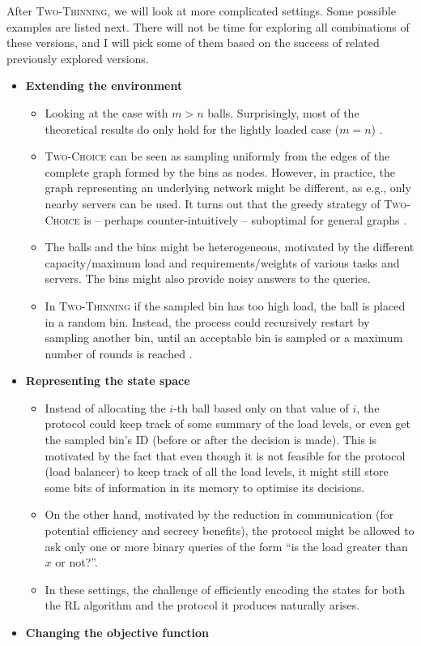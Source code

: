 After \textsc{Two-Thinning}, we will look at more complicated settings. Some possible examples are listed next. There will not be time for exploring all combinations of these versions, and I will pick some of them based on the success of related previously explored versions.
\begin{itemize}
    \item
    \textbf{Extending the environment}
    \begin{itemize}
        \item
        Looking at the case with $m>n$ balls. Surprisingly, most of the theoretical results do only hold for the lightly loaded case ($m=n$) \cite{berenbrink2006balanced}.
        \item
        \textsc{Two-Choice} can be seen as sampling uniformly from the edges of the complete graph formed by the bins as nodes. However, in practice, the graph representing an underlying network might be different, as e.g., only nearby servers can be used. It turns out that the greedy strategy of \textsc{Two-Choice} is -- perhaps counter-intuitively -- suboptimal for general graphs \cite{bansal2021well}.
        \item
        The balls and the bins might be heterogeneous, motivated by the different capacity/maximum load and requirements/weights of various tasks and servers. The bins might also provide noisy answers to the queries.
        \item
        In \textsc{Two-Thinning} if the sampled bin has too high load, the ball is placed in a random bin. Instead, the process could recursively restart by sampling another bin, until an acceptable bin is sampled or a maximum number of rounds is reached \cite{czumaj1997randomized}.
    \end{itemize}
    
    \item
    \textbf{Representing the state space}
    
    \begin{itemize}
        \item
        Instead of allocating the $i$-th ball based only on that value of $i$, the protocol could keep track of some summary of the load levels, or even get the sampled bin's ID (before or after the decision is made). This is motivated by the fact that even though it is not feasible for the protocol (load balancer) to keep track of all the load levels, it might still store some bits of information in its memory to optimise its decisions.
        \item
        On the other hand, motivated by the reduction in communication (for potential efficiency and secrecy benefits), the protocol might be allowed to ask only one or more binary queries of the form ``is the load greater than $x$ or not?''.
        \item
        In these settings, the challenge of efficiently encoding the states for both the RL algorithm and the protocol it produces naturally arises.
    \end{itemize}
    \item
    \textbf{Changing the objective function}
    

\end{itemize}
